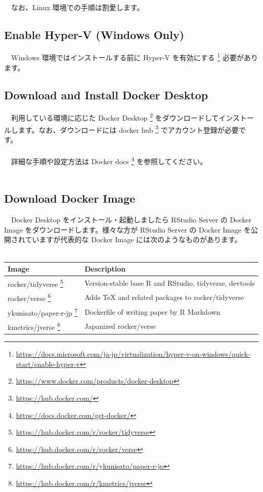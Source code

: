 \documentclass[
  12pt,
]{book}
\DeclareRobustCommand{\href}[2]{#2\footnote{\url{#1}}}
\begin{document}
　\\
　なお、Linux 環境での手順は割愛します。 　

\hypertarget{enable-hyper-v-windows-only}{%
\subsection{Enable Hyper-V (Windows Only)}\label{enable-hyper-v-windows-only}}

　Windows 環境ではインストールする前に \href{https://docs.microsoft.com/ja-jp/virtualization/hyper-v-on-windows/quick-start/enable-hyper-v}{Hyper-V を有効にする } 必要があります。

\hypertarget{download-and-install-docker-desktop}{%
\subsection{Download and Install Docker Desktop}\label{download-and-install-docker-desktop}}

　利用している環境に応じた \href{https://www.docker.com/products/docker-desktop}{Docker Desktop } をダウンロードしてインストールします。なお、ダウンロードには \href{https://hub.docker.com/}{docker hub } でアカウント登録が必要です。\\
　\\
　詳細な手順や設定方法は \href{https://docs.docker.com/get-docker/}{Docker docs } を参照してください。\\
　

\hypertarget{download-docker-image}{%
\subsection{Download Docker Image}\label{download-docker-image}}

　Docker Desktop をインストール・起動しましたら RStudio Server の Docker Image をダウンロードします。様々な方が RStudio Server の Docker Image を公開されていますが代表的な Docker Image には次のようなものがあります。\\
　

\begin{longtable}[]{@{}ll@{}}
\toprule
Image & Description \\
\midrule
\endhead
\href{https://hub.docker.com/r/rocker/tidyverse}{rocker/tidyverse } & Version-stable base R and RStudio, tidyverse, devtools \\
\href{https://hub.docker.com/r/rocker/verse}{rocker/verse } & Adds TeX and related packages to rocker/tidyverse \\
\href{https://hub.docker.com/r/ykunisato/paper-r-jp}{ykunisato/paper-r-jp } & Dockerfile of writing paper by R Markdown \\
\href{https://hub.docker.com/r/kmetrics/jverse}{kmetrics/jverse } & Japanized rocker/verse \\
\bottomrule
\end{longtable}
\end{document}
